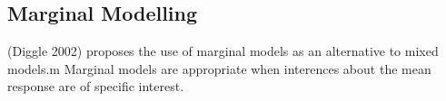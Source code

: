 \documentclass[12pt, a4paper]{report}
\theoremstyle{plain}
\theoremstyle{definition}
\theoremstyle{remark}
\begin{document}
\subsection{Marginal Modelling}
(Diggle 2002) proposes the use of marginal models as an
alternative to mixed models.m Marginal models are appropriate when
interences about the mean response are of specific interest.



\bigskip
{}



\end{document}
